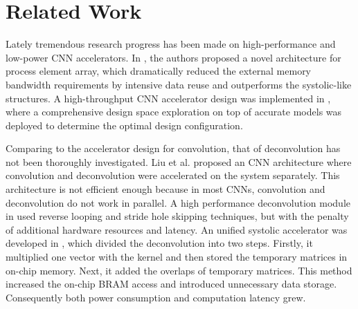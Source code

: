 \documentclass[conference]{IEEEtran}
\begin{document}
\begin{comment}
The operation numbers of convolution and deconvolution are extremely unbalanced in most neural networks like U-Net, FCN
, where convolution still dominants the computation complexity. Besides, concerning to the network structure, convolution and deconvolution won't work in parallel. This gives a good chance to merge these two operations into one block\cite{ref:shuanglong_2018}.
\end{comment}


\section{Related Work}

Lately tremendous research progress has been made on high-performance and low-power CNN accelerators. In \cite{ref:utku_2017}, the authors proposed a novel architecture for process element array, which dramatically reduced the external memory bandwidth requirements by intensive data reuse and outperforms the systolic-like structures\cite{ref:chen_2016}. A high-throughput CNN accelerator design was implemented in \cite{ref:xuechao_2017}, where a comprehensive design space exploration on top of accurate models was deployed to determine the optimal design configuration. 
\begin{comment}
Theoretically, those architectures are also capable of performing deconvolution operations. However, the zero-padding in deconvolution creates a great number of redundant calculations like multiplying by zeros.
\end{comment}

Comparing to the accelerator design for convolution, that of deconvolution has not been thoroughly investigated. 
Liu et al. proposed an CNN architecture where convolution and deconvolution were accelerated on the system separately\cite{ref:shuanglong_2018}. This architecture is not efficient enough because in most CNNs, convolution and deconvolution do not work in parallel. A high performance deconvolution module in \cite{ref:xinyu_2017} used reverse looping and stride hole skipping techniques, but with the penalty of additional hardware resources and latency. An unified systolic accelerator was developed in \cite{ref:fcnelement_2018}, which divided the deconvolution into two steps. Firstly, it multiplied one vector with the kernel and then stored the temporary matrices in on-chip memory. Next, it added the overlaps of temporary matrices. This method increased the on-chip BRAM access and introduced unnecessary data storage. Consequently both power consumption and computation latency grew.
\end{document}
